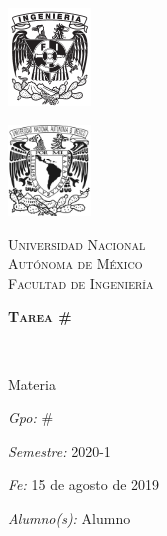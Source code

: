 \documentclass[a4paper,12pt]{article}
\newcommand{\coverPage}{
    \thispagestyle{empty}

    \begin{center}
      \begin{minipage}{0.48\textwidth} \begin{flushleft}
        \includegraphics[width=2.2cm]{escudofi_negro.jpg}
      \end{flushleft}\end{minipage}
      \begin{minipage}{0.48\textwidth} \begin{flushright}
        \includegraphics[width=2.2cm]{unam-10x10.jpg}
      \end{flushright}\end{minipage}
      \vspace*{-2.5cm}

      \textsc{\LARGE \University}\\[0.5cm]

      \textsc{\large \faculty}\\[0.5cm]
      \begin{minipage}{0.9\textwidth}
      \begin{center}
      \textsc{\Large \bfseries \mytitle}
      \end{center}
      \end{minipage}\\[0.5cm]

      \begin{minipage}{0.46\textwidth}
        \begin{flushleft} \large
          \subject
          \vspace*{0.2cm}
        \end{flushleft}
      \end{minipage}
      \begin{minipage}{0.52\textwidth}
        \vspace{-0.6cm}
        \begin{flushright} \large
            \emph{ Gpo: } \group
        \end{flushright}
      \end{minipage}


      \begin{minipage}{0.46\textwidth}
        \begin{flushleft} \large
          \emph{Semestre: }
          \vspace{0.6cm}
          \semester
        \end{flushleft}
      \end{minipage}
      \begin{minipage}{0.52\textwidth}
        \vspace{-0.8cm}
        \begin{flushright} \large
          \emph{Fe: } \deliverDate
        \end{flushright}
      \end{minipage}

      \vspace{-0.8cm}

      \begin{flushleft} \large
        \emph{Alumno(s): }
        \students
      \end{flushleft}


    \end{center}

}
\begin{document}

\graphicspath{ {assets/logos/} }

\newcommand{\university}{UNAM}
\newcommand{\University}{Universidad Nacional\\ 
  \vspace{5px} Autónoma de México
}
\newcommand{\faculty}{Facultad de Ingeniería}

\newcommand{\subject}{Materia}
\newcommand{\mytitle}{ Tarea \# }
\newcommand{\mysubTitle}{Titulo}
\newcommand{\students}{ Alumno }
\newcommand{\teacher}{Nombre de profesor}
\newcommand{\group}{\#}
\newcommand{\semester}{2020-1}
\newcommand{\deliverDate}{15 de agosto de 2019}

\coverPage


\end{document}
